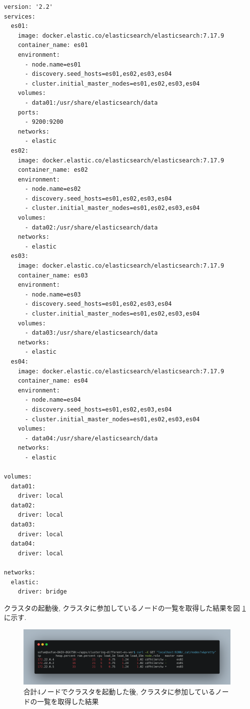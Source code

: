 \documentclass[a4j,12pt,]{jarticle}
\begin{document}
\begin{lstlisting}[caption=合計4ノードでクラスタBを起動する際に使用したdocker-compose.yml, label=sc3]
version: '2.2'
services:
  es01:
    image: docker.elastic.co/elasticsearch/elasticsearch:7.17.9
    container_name: es01
    environment:
      - node.name=es01
      - discovery.seed_hosts=es01,es02,es03,es04
      - cluster.initial_master_nodes=es01,es02,es03,es04
    volumes:
      - data01:/usr/share/elasticsearch/data
    ports:
      - 9200:9200
    networks:
      - elastic
  es02:
    image: docker.elastic.co/elasticsearch/elasticsearch:7.17.9
    container_name: es02
    environment:
      - node.name=es02
      - discovery.seed_hosts=es01,es02,es03,es04
      - cluster.initial_master_nodes=es01,es02,es03,es04
    volumes:
      - data02:/usr/share/elasticsearch/data
    networks:
      - elastic
  es03:
    image: docker.elastic.co/elasticsearch/elasticsearch:7.17.9
    container_name: es03
    environment:
      - node.name=es03
      - discovery.seed_hosts=es01,es02,es03,es04
      - cluster.initial_master_nodes=es01,es02,es03,es04
    volumes:
      - data03:/usr/share/elasticsearch/data
    networks:
      - elastic
  es04:
    image: docker.elastic.co/elasticsearch/elasticsearch:7.17.9
    container_name: es04
    environment:
      - node.name=es04
      - discovery.seed_hosts=es01,es02,es03,es04
      - cluster.initial_master_nodes=es01,es02,es03,es04
    volumes:
      - data04:/usr/share/elasticsearch/data
    networks:
      - elastic

volumes:
  data01:
    driver: local
  data02:
    driver: local
  data03:
    driver: local
  data04:
    driver: local

networks:
  elastic:
    driver: bridge
  \end{lstlisting}

クラスタの起動後, クラスタに参加しているノードの一覧を取得した結果を図 \ref{p3-1}に示す.

\begin{figure}[H]
  \begin{center}
    \includegraphics[width=160mm]{4nodes-list.png}
    \caption{合計4ノードでクラスタを起動した後, クラスタに参加しているノードの一覧を取得した結果}
    \label{p3-1}
  \end{center}
\end{figure}
\end{document}
